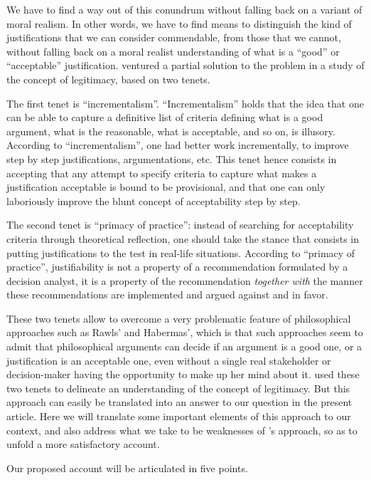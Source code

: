 \documentclass[preprint, french, english, 11pt, authoryear]{elsarticle}%
\begin{document}
We have to find a way out of this conundrum without falling back on a variant of moral realism. In other words, we have to find means to distinguish the kind of justifications that we can consider commendable, from those that we cannot, without falling back on a moral realist understanding of what is a ``good'' or ``acceptable'' justification. \cite{meinard_what_2017} ventured a partial solution to the problem in a study of the concept of legitimacy, based on two tenets.

The first tenet is ``incrementalism''. ``Incrementalism'' holds that the idea that one can be able to capture a definitive list of criteria defining what is a good argument, what is the reasonable, what is acceptable, and so on, is illusory. According to ``incrementalism'', one had better work incrementally, to improve step by step justifications, argumentations, etc. This tenet hence consists in accepting that any attempt to specify criteria to capture what makes a justification acceptable is bound to be provisional, and that one can only laboriously improve the blunt concept of acceptability step by step.

The second tenet is ``primacy of practice'': instead of searching for acceptability criteria through theoretical reflection, one should take the stance that consists in putting justifications to the test in real-life situations. According to ``primacy of practice'', justifiability is not a property of a recommendation formulated by a decision analyst, it is a property of the recommendation \emph{together with} the manner these recommendations are  implemented and argued against and in favor.

These two tenets allow to overcome a very problematic feature of philosophical approaches such as Rawls' and Habermas', which is that such approaches seem to admit that philosophical arguments can decide if an argument is a good one, or a justification is an acceptable one, even without a single real stakeholder or decision-maker having the opportunity to make up her mind about it.\cite{meinard_what_2017} used these two tenets to delineate an understanding of the concept of legitimacy. But this approach can easily be translated into an answer to our question in the present article. Here we will translate some important elements of this approach to our context, and also address what we take to be weaknesses of \cite{meinard_what_2017}'s approach, so as to unfold a more satisfactory account.

Our proposed account will be articulated in five points.
\end{document}
